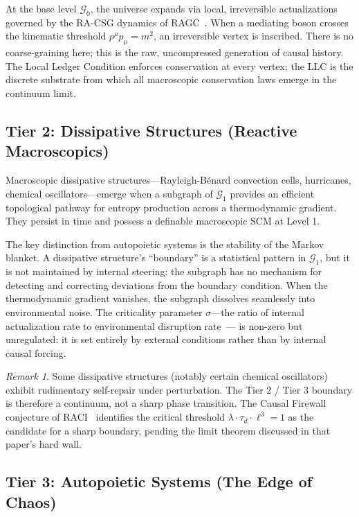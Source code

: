\documentclass[11pt,a4paper]{article}
\theoremstyle{remark}
\newtheorem{remark}[theorem]{Remark}
\newcommand{\GG}{\mathcal{G}}
\newcommand{\sigmaedge}{\sigma}
\begin{document}
At the base level $\GG_0$, the universe expands via local, irreversible
actualizations governed by the RA-CSG dynamics of RAGC~\citep{Sandeman2026b}.
When a mediating boson crosses the kinematic threshold $p^{\mu}p_{\mu} = m^2$,
an irreversible vertex is inscribed. There is no coarse-graining here; this is
the raw, uncompressed generation of causal history. The Local Ledger Condition
enforces conservation at every vertex; the LLC is the discrete substrate from
which all macroscopic conservation laws emerge in the continuum limit.

\subsection{Tier 2: Dissipative Structures (Reactive Macroscopics)}

Macroscopic dissipative structures---Rayleigh-B\'{e}nard convection cells,
hurricanes, chemical oscillators---emerge when a subgraph of $\GG_1$ provides an
efficient topological pathway for entropy production across a thermodynamic
gradient. They persist in time and possess a definable macroscopic SCM at Level 1.

The key distinction from autopoietic systems is the stability of the Markov
blanket. A dissipative structure's ``boundary'' is a statistical pattern in
$\GG_1$, but it is not maintained by internal steering: the subgraph has no
mechanism for detecting and correcting deviations from the boundary condition.
When the thermodynamic gradient vanishes, the subgraph dissolves seamlessly into
environmental noise. The criticality parameter $\sigmaedge$---the ratio of
internal actualization rate to environmental disruption rate~\citep{Sandeman2026c}---
is non-zero but unregulated: it is set entirely by external conditions rather than
by internal causal forcing.

\begin{remark}
Some dissipative structures (notably certain chemical oscillators) exhibit
rudimentary self-repair under perturbation. The Tier 2 / Tier 3 boundary is
therefore a continuum, not a sharp phase transition. The Causal Firewall conjecture
of RACI~\citep{Sandeman2026c} identifies the critical threshold
$\lambda \cdot \tau_d \cdot \ell^3 = 1$ as the candidate for a sharp boundary,
pending the limit theorem discussed in that paper's hard wall.
\end{remark}

\subsection{Tier 3: Autopoietic Systems (The Edge of Chaos)}
\end{document}
